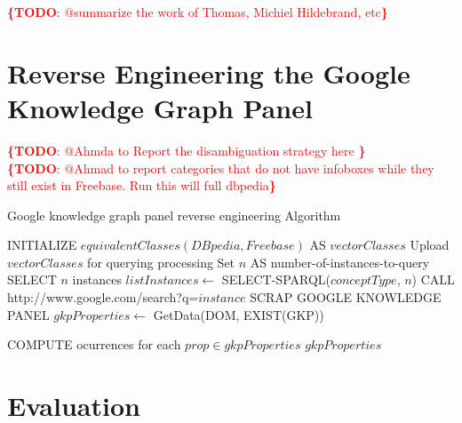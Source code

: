 \documentclass[runningheads,a4paper]{llncs}
\newcommand{\todo}[1]{\noindent\textcolor{red}{{\bf \{TODO}: #1{\bf \}}}}
\begin{document}
\todo{@summarize the work of Thomas, Michiel Hildebrand, etc}


\section{Reverse Engineering the Google Knowledge Graph Panel}
\label{sec:knowledge-graph}

 \todo{@Ahmda to Report the disambiguation strategy here } \\
 \todo{@Ahmad to report categories that do not have infoboxes while they still exist in Freebase. Run this will full dbpedia}
 
\begin{algorithm}[H]
\caption{Google knowledge graph panel reverse engineering Algorithm} \label{algoscrapping}
\begin{algorithmic}[1]
    \STATE INITIALIZE $equivalentClasses(DBpedia,Freebase) $ AS $vectorClasses$
    \STATE Upload $vectorClasses$ for querying processing
    \STATE Set $n$ AS number-of-instances-to-query
	\STATE SELECT $n$ instances
	\STATE $listInstances \leftarrow$ SELECT-SPARQL($conceptType$, $n$)
			\STATE CALL http://www.google.com/search?q=$instance$
			\STATE SCRAP GOOGLE KNOWLEDGE PANEL
			\STATE $gkpProperties \leftarrow$ GetData(DOM, EXIST(GKP))
			
		\ENDFOR
	\STATE COMPUTE ocurrences for each $prop \in gkpProperties$
    \ENDFOR
    \RETURN $gkpProperties$
\end{algorithmic}
\end{algorithm}



\section{Evaluation}
\label{sec:evaluation}
\end{document}

